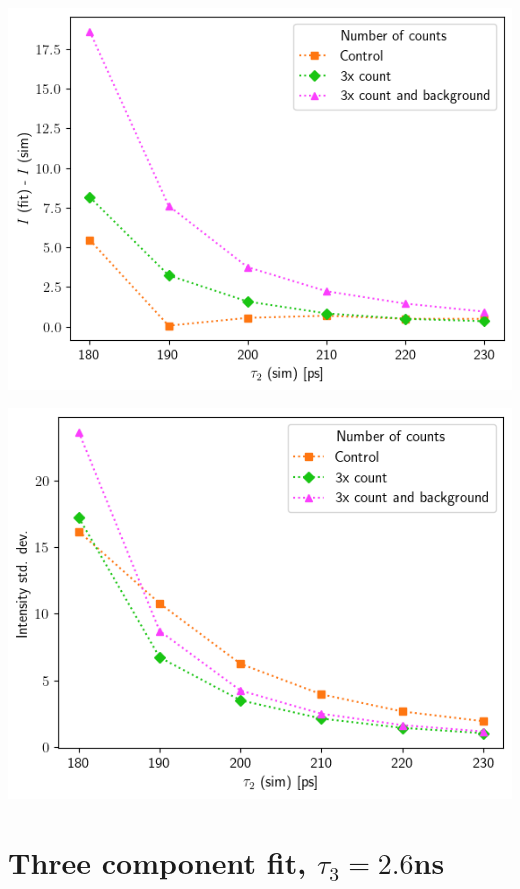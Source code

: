 {\begin{minipage}{ .47\linewidth}
    \includegraphics[width=\linewidth]{Batch 5/8020-diff i1.png}
    \label{fig:compcount-I-8020}
\end{minipage}
\hfill
\begin{minipage}{ .47\linewidth}
    \includegraphics[width=\linewidth]{Batch 5/8020-err i1.png}
    \label{fig:compcount-Ierr-8020}
\end{minipage}
}

\section{\boldmath Three component fit, $\tau_3=2.6$ns\unboldmath}

